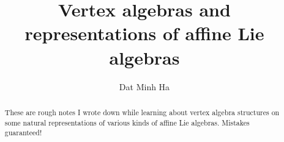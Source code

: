 

\setcounter{section}{-1}





    \title{Vertex algebras and representations of affine Lie algebras}
    
    \author{Dat Minh Ha}
    \maketitle
    
    \begin{abstract}
        These are rough notes I wrote down while learning about vertex algebra structures on some natural representations of various kinds of affine Lie algebras. Mistakes guaranteed!
    \end{abstract}
    
    {
    \hypersetup{} 
    \tableofcontents %
    }

    

    

    

    

    

    

    \begin{appendices}
        
    
        
    \end{appendices}
    
    \printbibliography

